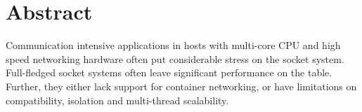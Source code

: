 \section*{Abstract}

Communication intensive applications in hosts with multi-core CPU and high speed networking hardware often put considerable stress on the socket system.
Full-fledged socket systems often leave significant performance on the table.
Further, they either lack support for container networking, or have limitations on compatibility, isolation and multi-thread scalability.



